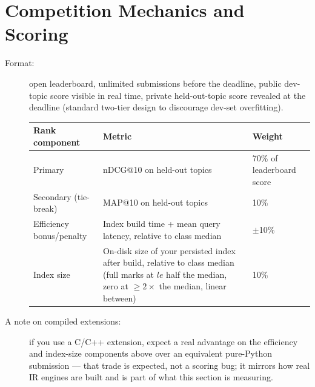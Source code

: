 \documentclass[10pt]{article}
\begin{document}
\section{Competition Mechanics and Scoring}
\begin{description}
\item[Format:] open leaderboard, unlimited submissions before the deadline, public dev-topic score visible in real time, private held-out-topic score revealed at the deadline (standard two-tier design to discourage dev-set overfitting).
\begin{center}
\begin{tabular}{|l | p{5cm} | l |}
\hline
\textbf{Rank component}	& \textbf{Metric} &\textbf{	Weight}\\
\hline
\hline
Primary	& nDCG@10 on held-out topics	 & 70\% of leaderboard score\\
\hline
Secondary (tie-break)&	MAP@10 on held-out topics&	10\%\\
\hline
Efficiency bonus/penalty& 	Index build time + mean query latency, relative to class median	&  $\pm$10\% \\
\hline
Index size	& On-disk size of your persisted index after build, relative to class median (full marks at $le$ half the median, zero at $\ge 2\times$ the median, linear between)	& 10\% \\
\hline
\end{tabular}
\end{center}
\item[A note on compiled extensions:] if you use a C/C++ extension, expect a real advantage on the efficiency and index-size components above over an equivalent pure-Python submission — that trade is expected, not a scoring bug; it mirrors how real IR engines are built and is part of what this section is measuring.


\end{description}
\end{document}
